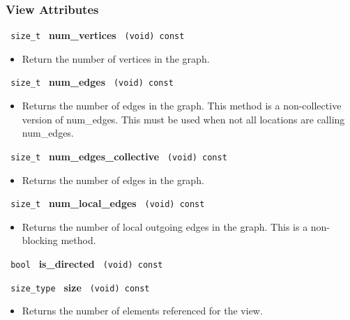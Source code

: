 \subsubsection{ View Attributes}

\noindent
\texttt{%
size\_t
}
\newline
\textbf{num\_vertices}%
\texttt{%
(void) const
}

\begin{itemize}
\item
Return the number of vertices in the graph.
\end{itemize}

\noindent
\texttt{%
size\_t
}
\newline
\textbf{num\_edges}%
\texttt{%
(void) const
}

\begin{itemize}
\item
Returns the number of edges in the graph. This method is a non-collective version of num\_edges. This must be used when not all locations are calling num\_edges.
\end{itemize}

\noindent
\texttt{%
size\_t
}
\newline
\textbf{num\_edges\_collective}%
\texttt{%
(void) const
}

\begin{itemize}
\item
Returns the number of edges in the graph.
\end{itemize}

\noindent
\texttt{%
size\_t
}
\newline
\textbf{num\_local\_edges}%
\texttt{%
(void) const
}

\begin{itemize}
\item
Returns the number of local outgoing edges in the graph. This is a non-blocking method.
\end{itemize}

\noindent
\texttt{%
bool
}
\newline
\textbf{is\_directed}%
\texttt{%
(void) const
}

\noindent
\texttt{%
size\_type
}
\newline
\textbf{size}%
\texttt{%
(void) const
}

\begin{itemize}
\item
Returns the number of elements referenced for the view.
\end{itemize}

